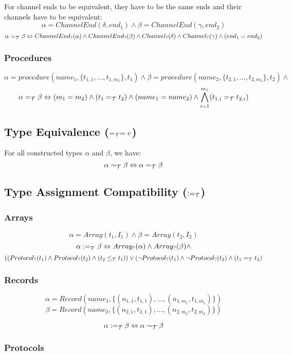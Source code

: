 \documentclass[]{article}
\begin{document}
For channel ends to be equivalent, they have to be the same ends and their channels have to be equivalent:
\[
\alpha = ChannelEnd(\delta, end_1) \wedge \beta = ChannelEnd(\gamma, end_2)
\]
\[
\alpha =_{\cal T} \beta \Leftrightarrow ChannelEnd_?(\alpha) \wedge ChannelEnd_?(\beta) \wedge Channel_?(\delta) \wedge Channel_?(\gamma) \wedge (end_1 = end_2)
\]

\subsubsection{Procedures}

\[
\alpha = procedure(name_1, \{t_{1,1},\ldots,t_{1,m_1}\}, t_1) \wedge
\beta = procedure(name_2, \{t_{2,1},\ldots,t_{2,m_2}\}, t_2) \wedge
\]
\[
\alpha =_{\cal T} \beta \Leftrightarrow (m_1 = m_2) \wedge (t_1 =_{\cal T} t_2) \wedge (name_1 = name_2) \wedge \bigwedge^{m_1}_{i=1}(t_{1,i} =_{\cal T} t_{2,i})
\]
\subsection{Type Equivalence ($=_{\cal T}=v$)}

For all constructed types $\alpha$ and $\beta$, we have:
\[
\alpha \sim_{\cal T} \beta \Leftrightarrow \alpha =_{\cal T} \beta
\]

\subsection{Type Assignment Compatibility ($:=_{\cal T}$)}

\subsubsection{Arrays}

\[
\alpha = Array(t_1, I_1) \wedge \beta =  Array(t_2, I_2)
\]
\[
\alpha :=_{\cal T} \beta \Leftrightarrow Array_?(\alpha) \wedge Array_?(\beta) \wedge
\]
\[
((Protocol_?(t_1) \wedge Protocol_?(t_2) \wedge (t_2 \leq_{\cal T} t_1)) \vee
(\neg{}Protocol_?(t_1) \wedge \neg{}Protocol_?(t_2) \wedge (t_1 =_{\cal T} t_2)
\]
\subsubsection{Records}

\[
\alpha = Record(name_1, \{(n_{1,1},t_{1,1}),\ldots,(n_{1,m_1}, t_{1,m_1})\})
\]
\[
\beta = Record(name_2, \{(n_{2,1},t_{2,1}),\ldots,(n_{2,m_2}, t_{2,m_2})\})
\]

\[
\alpha :=_{\cal T} \beta \Leftrightarrow \alpha \sim_{\cal T} \beta
\]
\subsubsection{Protocols}
\end{document}
